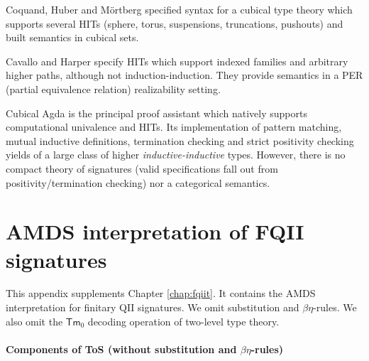 \documentclass[12pt,a4paper,twoside,openany]{book}
\theoremstyle{remark}
\theoremstyle{definition}
\theoremstyle{theorem}
\newcommand{\Tm}{\mathsf{Tm}}
\begin{document}
Coquand, Huber and Mörtberg \cite{cubicalhits} specified syntax for a cubical
type theory which supports several HITs (sphere, torus, suspensions,
truncations, pushouts) and built semantics in cubical sets.

Cavallo and Harper \cite{cubicalcomptt} specify HITs which support indexed
families and arbitrary higher paths, although not induction-induction. They
provide semantics in a PER (partial equivalence relation) realizability setting.

Cubical Agda \cite{cubicalagda} is the principal proof assistant which natively
supports computational univalence and HITs. Its implementation of pattern
matching, mutual inductive definitions, termination checking and strict
positivity checking yields of a large class of higher \emph{inductive-inductive}
types. However, there is no compact theory of signatures (valid specifications
fall out from positivity/termination checking) nor a categorical semantics.


\appendix

\chapter{AMDS interpretation of FQII signatures}
\label{app:fqii-amds}

This appendix supplements Chapter \ref{chap:fqiit}. It contains the AMDS
interpretation for finitary QII signatures. We omit substitution and
$\beta\eta$-rules. We also omit the $\Tm_0$ decoding operation of two-level type
theory.

\pagebreak

\subsubsection{Components of ToS (without substitution and $\beta\eta$-rules)}
\end{document}
